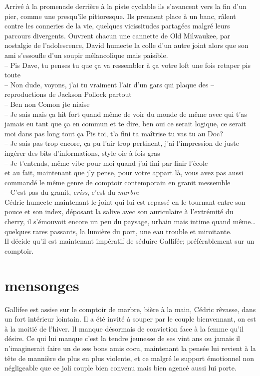 \documentclass{article}
\begin{document}
Arrivé à la promenade derrière à la piste cyclable ils s'avancent vers la
fin d'un pier, comme une presqu'île pittoresque.
Ils prennent place à un
banc, râlent contre les conneries de la vie, quelques vicissitudes partagées
malgré leurs parcours divergents. Ouvrent chacun une cannette de Old Milwaukee,
par nostalgie de l'adolescence, David humecte la colle d'un autre joint alors que
son ami s'essoufle d'un soupir mélancolique mais paisible. \\
-- Pis Dave, tu penses tu que ça va ressembler à ça votre loft une fois retaper pis toute\\
-- Non dude, voyons, j'ai tu vraiment l'air d'un gars qui plaque des
-- reproductions de Jackson Pollock partout \\
-- Ben non Comon jte niaise\\
-- Je sais mais ça hit fort quand même de voir du monde de même avec qui
t'as jamais eu tant que ça en commun et te dire, ben oui ce serait logique,
ce serait moi dans pas long tout ça \textelp{} Pis toi, t'a fini ta maîtrise tu
vas tu au Doc?\\
-- Je sais pas trop encore, ça pu l'air trop pertinent, j'ai l'impression
de juste ingérer des bits d'informations, style oie à fois gras\\
-- Je t'entends, même vibe pour moi quand j'ai fini par finir l'école\\

\textelp{} et au fait, maintenant que j'y pense, pour votre appart là, vous
avez pas aussi commandé le même genre de comptoir contemporain en granit
messemble\\
-- C'est pas du granit, \emph{criss}, c'est du \emph{marbre}\\

Cédric humecte maintenant le joint qui lui est repassé en le tournant entre son
pouce et son index, déposant la salive avec son auriculaire à l'extrémité du
cherry, il s'émouvoit encore un peu du paysage, urbain mais intime quand
même\ldots quelques rares passants, la lumière du port, une eau trouble et
miroitante.\\[1ex]
Il décide qu'il est maintenant impératif de séduire Gallifée; préférablement sur un comptoir.
\clearpage


\section{mensonges}

Gallifee est assise sur le comptoir de marbre, bière à la main, Cédric rêvasse,
dans un fort intérieur lointain. Il a été invité à souper par le couple
bienvennant, on est à la moitié de l'hiver. Il manque désormais de conviction
face à la femme qu'il désire. Ce qui lui manque c'est la tendre jeunesse de
ses vint ans ou jamais il n'imaginerait faire un de ses bons amis cocu, maintenant
la pensée lui revient à la tête de mannière de plus en plus violente, et ce malgré
le support émotionnel non négligeable que ce joli couple bien convenu mais bien
agencé aussi lui porte. \\
\end{document}
